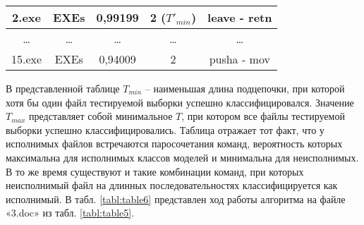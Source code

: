 \documentclass{book}
\begin{document}
\begin{table}[h!]
\begin{tabular}{|c|c|c|c|c|}
		2.exe  & EXEs                                                        & 0,99199     & 2 ($T'_{min}$)                                                                       & leave - retn                                                                            \\ \hline
		\ldots    & \ldots                                                         & \ldots         & \ldots                                                                             & \ldots                                                                                     \\ \hline
		15.exe & EXEs                                                        & 0,94009     & 2                                                                               & pusha - mov                                                                             \\ \hline
	\end{tabular}

\end{table}
	

В представленной таблице $T_{min}$ – наименьшая длина подцепочки, при которой хотя 
бы один файл тестируемой выборки успешно классифицировался. Значение $T_{max}$ представляет 
собой минимальное $T$, при котором все файлы тестируемой выборки успешно классифицировались. 
Таблица отражает тот факт, что у исполнимых файлов встречаются паросочетания команд, вероятность 
которых максимальна для исполнимых классов моделей и минимальна для неисполнимых. В то же время 
существуют и такие комбинации команд, при которых неисполнимый файл на длинных последовательностях 
классифицируется как исполнимый. В табл. \ref{tabl:table6} представлен ход работы алгоритма на файле «3.doc» из табл. \ref{tabl:table5}.

\end{document}
